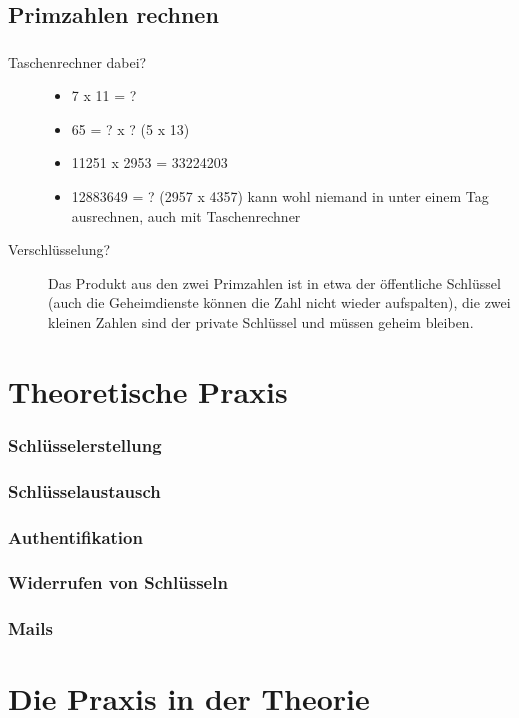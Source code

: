\documentclass[compress]{beamer}
\begin{document}
\subsection{Primzahlen rechnen}
\begin{frame}
  \frametitle{\insertsubsection}
  \begin{description}
  \item[Taschenrechner dabei?]
    \begin{itemize}
    \item 7 x 11 = ?
    \item 65 = ? x ? (5 x 13)
    \item 11251 x 2953 = 33224203
    \item 12883649 = ? (2957 x 4357) kann wohl niemand in unter einem
      Tag ausrechnen, auch mit Taschenrechner
    \end{itemize}
  \item[Verschlüsselung?] Das Produkt aus den zwei Primzahlen ist in
    etwa der öffentliche Schlüssel (auch die Geheimdienste können die
    Zahl nicht wieder aufspalten), die zwei kleinen Zahlen sind der
    private Schlüssel und müssen geheim bleiben.
  \end{description}
\end{frame}

\section{Theoretische Praxis}
\label{sec-1-1-4}

\begin{frame}
    \frametitle{Schlüsselerstellung}
\end{frame}
\begin{frame}
    \frametitle{Schlüsselaustausch}
\end{frame}
\begin{frame}
    \frametitle{Authentifikation}
\end{frame}
\begin{frame}
    \frametitle{Widerrufen von Schlüsseln}
\end{frame}
\begin{frame}
    \frametitle{Mails}
\end{frame}

\section{Die Praxis in der Theorie}
\label{sec-1-1-5}
\end{document}
